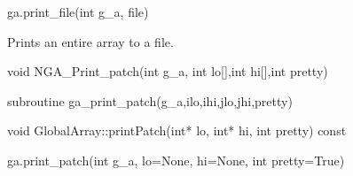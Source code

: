 \documentclass[10pt]{article}
\begin{document}
\begin{pyapi}
\begin{pycode}
ga.print_file(int g_a, file)
\end{pycode}
\begin{funcargs}
\end{funcargs}
\end{pyapi}

\gcoll

\begin{desc}

Prints an entire array to a file.

\end{desc}


\begin{capi}
\begin{ccode}
void NGA_Print_patch(int g_a, int lo[],int hi[],int pretty)
\end{ccode}
\begin{funcargs}
\end{funcargs}
\end{capi}

\begin{f2dapi}
\begin{fcode}
subroutine ga_print_patch(g_a,ilo,ihi,jlo,jhi,pretty)
\end{fcode}
\begin{funcargs}
\end{funcargs}
\end{f2dapi}

\begin{cxxapi}
\begin{cxxcode}
void GlobalArray::printPatch(int* lo, int* hi, int pretty) const
\end{cxxcode}
\begin{funcargs}
\end{funcargs}
\end{cxxapi}

\begin{pyapi}
\begin{pycode}
ga.print_patch(int g_a, lo=None, hi=None, int pretty=True)
\end{pycode}
\begin{funcargs}
\end{funcargs}
\end{pyapi}
\end{document}
